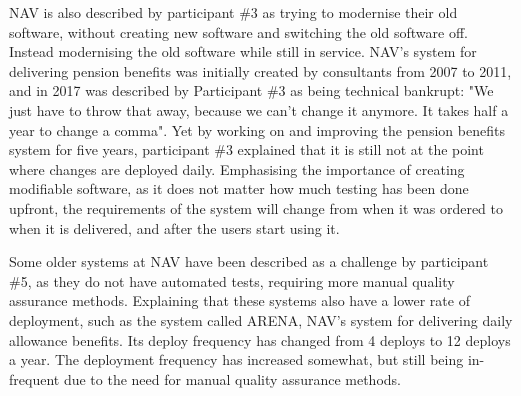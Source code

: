 
NAV is also described by participant \#3 as trying to modernise their old software, without creating new software and switching the old software off. Instead modernising the old software while still in service. NAV's system for delivering pension benefits was initially created by consultants from 2007 to 2011, and in 2017 was described by Participant \#3 as being technical bankrupt: "We just have to throw that away, because we can't change it anymore. It takes half a year to change a comma". Yet by working on and improving the pension benefits system for five years, participant \#3 explained that it is still not at the point where changes are deployed daily. Emphasising the importance of creating modifiable software, as it does not matter how much testing has been done upfront, the requirements of the system will change from when it was ordered to when it is delivered, and after the users start using it.


Some older systems at NAV have been described as a challenge by participant \#5, as they do not have automated tests, requiring more manual quality assurance methods. Explaining that these systems also have a lower rate of deployment, such as the system called ARENA, NAV's system for delivering daily allowance benefits. Its deploy frequency has changed from 4 deploys to 12 deploys a year. The deployment frequency has increased somewhat, but still being in-frequent due to the need for manual quality assurance methods.

